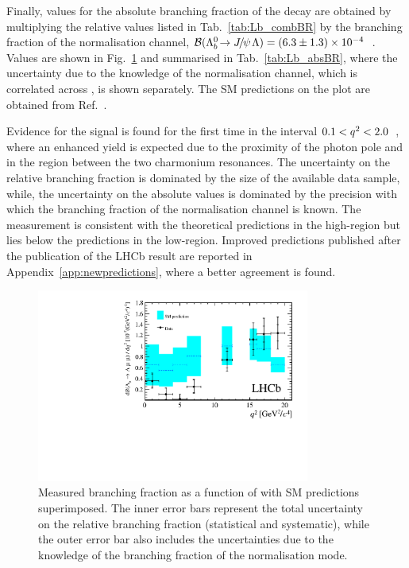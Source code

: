 Finally, values for the absolute branching fraction of the \decay{\Lb}{\Lz\mumu} decay are obtained by multiplying 
the relative values listed in Tab.~\ref{tab:Lb_combBR} by the branching fraction of the normalisation channel,
$\BF(\decay{\Lb}{\jpsi\Lz})=(6.3\pm1.3)\times10^{-4}$~\cite{PDG2014}.
Values are shown in Fig.~\ref{fig:Lb_absBR} and summarised in Tab.~\ref{tab:Lb_absBR}, where the uncertainty
due to the knowledge of the normalisation channel, which is correlated across \qsq, is shown separately.
The SM predictions on the plot are obtained from Ref.~\cite{Detmold:2012vy}.  

Evidence for the signal is found for the first time in the interval \mbox{$0.1 < q^2 < 2.0$~\gevgevcccc}, where 
an enhanced yield is expected due to the proximity of the photon pole and in the region between the two charmonium 
resonances. The uncertainty on the relative branching fraction is dominated by the size of the available data sample, while,
the uncertainty on the absolute values is dominated by the precision with which the branching 
fraction of the normalisation channel is known.
The measurement is consistent with the theoretical predictions in the high-\qsq region 
but lies below the predictions in the low-\qsq region. Improved predictions published after the publication 
of the LHCb result are reported in Appendix~\ref{app:newpredictions}, where a better agreement is found.

\begin{figure}
\centering
\includegraphics[width=0.8\textwidth]{Lmumu/figs/paper/figure5.pdf}
\caption{Measured \protect\decay{\Lb}{\Lz\mumu} branching
   fraction as a function of \qsq with SM predictions~\cite{Detmold:2012vy} superimposed.  
   The inner error bars represent the total uncertainty on the relative branching
   fraction (statistical and systematic), while the outer error bar also
   includes the uncertainties due to the knowledge of the branching fraction of the
   normalisation mode.}  
\label{fig:Lb_absBR}
\end{figure}

